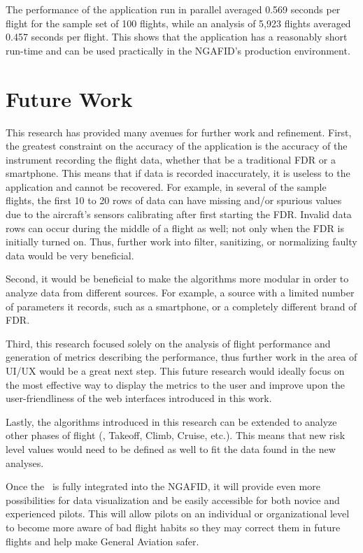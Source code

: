 	The performance of the application run in parallel averaged 0.569 seconds per flight for the sample set of 100 flights, while an analysis of 5,923 flights averaged 0.457 seconds per flight.  This shows that the application has a reasonably short run-time and can be used practically in the NGAFID's production environment.


\section{Future Work} \label{sec:future_work}

	This research has provided many avenues for further work and refinement.  First, the greatest constraint on the accuracy of the application is the accuracy of the instrument recording the flight data, whether that be a traditional FDR or a smartphone.  This means that if data is recorded inaccurately, it is useless to the application and cannot be recovered.  For example, in several of the sample flights, the first 10 to 20 rows of data can have missing and/or spurious values due to the aircraft's sensors calibrating after first starting the FDR.  Invalid data rows can occur during the middle of a flight as well; not only when the FDR is initially turned on.  Thus, further work into filter, sanitizing, or normalizing faulty data would be very beneficial.
	
	Second, it would be beneficial to make the algorithms more modular in order to analyze data from different sources.  For example, a source with a limited number of parameters it records, such as a smartphone, or a completely different brand of FDR.
	
	Third, this research focused solely on the analysis of flight performance and generation of metrics describing the performance, thus further work in the area of UI/UX would be a great next step.  This future research would ideally focus on the most effective way to display the metrics to the user and improve upon the user-friendliness of the web interfaces introduced in this work.
	
	Lastly, the algorithms introduced in this research can be extended to analyze other phases of flight (\ie, Takeoff, Climb, Cruise, etc.).  This means that new risk level values would need to be defined as well to fit the data found in the new analyses.
    
    Once the \toolname\ is fully integrated into the NGAFID, it will provide even more possibilities for data visualization and be easily accessible for both novice and experienced pilots.  This will allow pilots on an individual or organizational level to become more aware of bad flight habits so they may correct them in future flights and help make General Aviation safer.